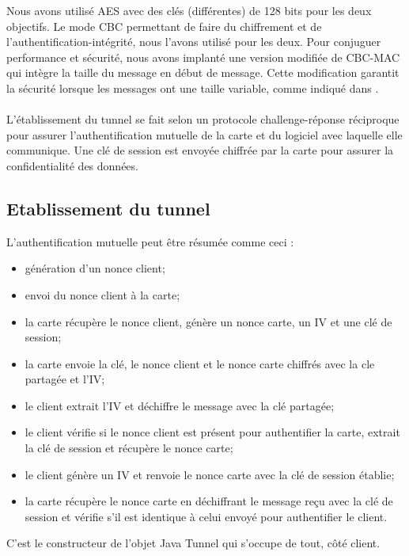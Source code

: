 \documentclass[a4paper,11pt,french]{article}
\begin{document}
Nous avons utilisé AES avec des clés (différentes) de 128 bits pour les deux 
objectifs. Le mode CBC permettant de faire du chiffrement et de 
l'authentification-intégrité, nous l'avons utilisé pour les deux. Pour conjuguer
performance et sécurité, nous avons implanté une version modifiée de CBC-MAC qui
intègre la taille du message en début de message. Cette modification garantit la
sécurité lorsque les messages ont une taille variable, comme indiqué dans 
\cite{CBC-MAC}.


\paragraph{}
L'établissement du tunnel se fait selon un protocole challenge-réponse 
réciproque pour assurer l'authentification mutuelle de la carte et du logiciel 
avec laquelle elle communique. Une clé de session est envoyée chiffrée par la 
carte pour assurer la confidentialité des données.

\subsection{Etablissement du tunnel}
L'authentification mutuelle peut être résumée comme ceci : 
\begin{itemize}
    \item génération d'un nonce client;
    \item envoi du nonce client à la carte;
    \item la carte récupère le nonce client, génère un nonce carte, un IV et une clé
        de session;
    \item la carte envoie la clé, le nonce client et le nonce carte chiffrés avec la
        cle partagée et l'IV;
    \item le client extrait l'IV et déchiffre le message avec la clé partagée;
    \item le client vérifie si le nonce client est présent pour authentifier la 
        carte, extrait la clé de session et récupère le nonce carte;
    \item le client génère un IV et renvoie le nonce carte avec la clé de session 
        établie;
    \item la carte récupère le nonce carte en déchiffrant le message reçu avec 
        la clé de session et vérifie s'il est identique à celui envoyé pour 
        authentifier le client.
\end{itemize}

C'est le constructeur de l'objet Java \og{}Tunnel \fg{} qui s'occupe de tout,
côté client.
\end{document}
